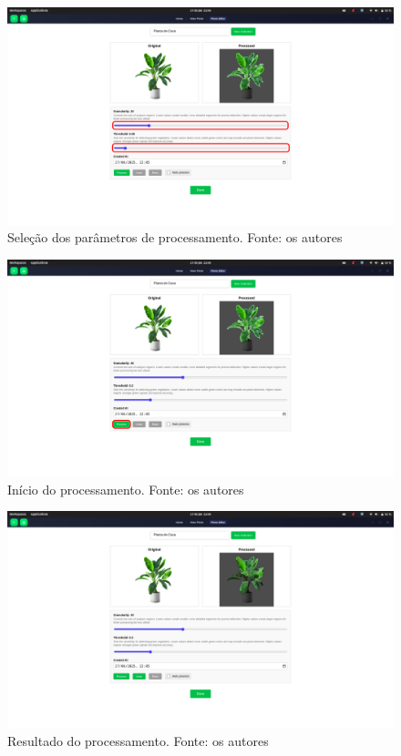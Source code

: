 \begin{figure}[H]
    \centering
    \includegraphics[width=1\textwidth]{../figures/screens/uc011/Screenshot from 2025-06-27 22-08-20.png}
    \caption{Seleção dos parâmetros de processamento. Fonte: os autores}
    \label{fig:uc011-screen3}
\end{figure}

\begin{figure}[H]
    \centering
    \includegraphics[width=1\textwidth]{../figures/screens/uc011/Screenshot from 2025-06-27 22-08-42.png}
    \caption{Início do processamento. Fonte: os autores}
    \label{fig:uc011-screen4}
\end{figure}

\begin{figure}[H]
    \centering
    \includegraphics[width=1\textwidth]{../figures/screens/uc011/Screenshot from 2025-06-27 22-08-53.png}
    \caption{Resultado do processamento. Fonte: os autores}
    \label{fig:uc011-screen5}
\end{figure}

